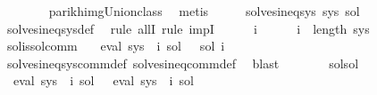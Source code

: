 \begin{isabellebody}
\ \ \ \ \ \ \isamarkupfalse%
\ parikh{\isacharunderscore}{\kern0pt}img{\isacharunderscore}{\kern0pt}Union{\isacharunderscore}{\kern0pt}class\ \isamarkupfalse%
\ metis\isanewline
\ \ \isamarkupfalse%
\ \isamarkupfalse%
\ {\isachardoublequoteopen}solves{\isacharunderscore}{\kern0pt}ineq{\isacharunderscore}{\kern0pt}sys\ sys\ {\isacharquery}{\kern0pt}sol{\isacharprime}{\kern0pt}{\isachardoublequoteclose}\isanewline
\ \ \isamarkupfalse%
\ solves{\isacharunderscore}{\kern0pt}ineq{\isacharunderscore}{\kern0pt}sys{\isacharunderscore}{\kern0pt}def\ \isamarkupfalse%
\ {\isacharparenleft}{\kern0pt}rule\ allI{\isacharcomma}{\kern0pt}\ rule\ impI{\isacharparenright}{\kern0pt}\isanewline
\ \ \ \ \isamarkupfalse%
\ i\isanewline
\ \ \ \ \isamarkupfalse%
\ {\isachardoublequoteopen}i\ {\isacharless}{\kern0pt}\ length\ sys{\isachardoublequoteclose}\isanewline
\ \ \ \ \isamarkupfalse%
\ sol{\isacharunderscore}{\kern0pt}is{\isacharunderscore}{\kern0pt}sol{\isacharunderscore}{\kern0pt}comm\ \isamarkupfalse%
\ {\isachardoublequoteopen}{\isasymPsi}\ {\isacharparenleft}{\kern0pt}eval\ {\isacharparenleft}{\kern0pt}sys\ {\isacharbang}{\kern0pt}\ i{\isacharparenright}{\kern0pt}\ sol{\isacharparenright}{\kern0pt}\ {\isasymsubseteq}\ {\isasymPsi}\ {\isacharparenleft}{\kern0pt}sol\ i{\isacharparenright}{\kern0pt}{\isachardoublequoteclose}\isanewline
\ \ \ \ \ \ \isamarkupfalse%
\ solves{\isacharunderscore}{\kern0pt}ineq{\isacharunderscore}{\kern0pt}sys{\isacharunderscore}{\kern0pt}comm{\isacharunderscore}{\kern0pt}def\ solves{\isacharunderscore}{\kern0pt}ineq{\isacharunderscore}{\kern0pt}comm{\isacharunderscore}{\kern0pt}def\ \isamarkupfalse%
\ blast\isanewline
\ \ \ \ \isamarkupfalse%
\ \isamarkupfalse%
\ sol{\isacharprime}{\kern0pt}{\isacharunderscore}{\kern0pt}sol\ \isamarkupfalse%
\ {\isachardoublequoteopen}{\isasymPsi}\ {\isacharparenleft}{\kern0pt}eval\ {\isacharparenleft}{\kern0pt}sys\ {\isacharbang}{\kern0pt}\ i{\isacharparenright}{\kern0pt}\ {\isacharquery}{\kern0pt}sol{\isacharprime}{\kern0pt}{\isacharparenright}{\kern0pt}\ {\isacharequal}{\kern0pt}\ {\isasymPsi}\ {\isacharparenleft}{\kern0pt}eval\ {\isacharparenleft}{\kern0pt}sys\ {\isacharbang}{\kern0pt}\ i{\isacharparenright}{\kern0pt}\ sol{\isacharparenright}{\kern0pt}{\isachardoublequoteclose}\isanewline

\end{isabellebody}
